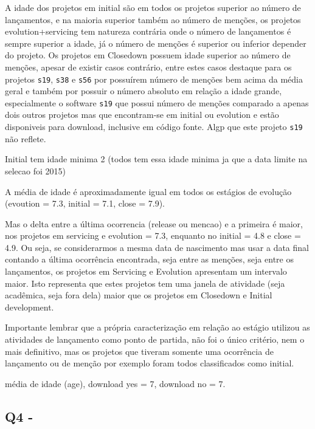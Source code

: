 A idade dos projetos em initial são em todos os projetos superior ao número de
lançamentos, e na maioria superior também ao número de menções, os projetos
evolution+servicing tem natureza contrária onde o número de lançamentos é
sempre superior a idade, já o número de menções é superior ou inferior depender
do projeto. Os projetos em Closedown possuem idade superior ao número de
menções, apesar de existir casos contrário, entre estes casos destaque para os
projetos \texttt{s19}, \texttt{s38} e \texttt{s56} por possuírem número de
menções bem acima da média geral e também por possuir o número absoluto em
relação a idade grande, especialmente o software \texttt{s19} que possui número
de menções comparado a apenas dois outros projetos mas que encontram-se em
initial ou evolution e estão disponiveis para download, inclusive em código
fonte. Algp que este projeto \texttt{s19} não reflete.

Initial tem idade minima 2 (todos tem essa idade minima ja que a data limite na selecao foi 2015)

A média de idade é aproximadamente igual em todos os estágios de evolução (evoution = 7.3, initial = 7.1, close = 7.9).

Mas o delta entre a última ocorrencia (release ou mencao) e a primeira é maior,
nos projetos em servicing e evolution = 7.3,
enquanto no initial = 4.8 e close = 4.9. Ou seja, se considerarmos a mesma data de nascimento
mas usar a data final contando a última ocorrência encontrada, seja entre as menções, seja
entre os lançamentos, os projetos em Servicing e Evolution apresentam um intervalo maior. Isto
representa que estes projetos tem uma janela de atividade (seja acadêmica, seja fora dela) maior que
os projetos em Closedown e Initial development.

Importante lembrar que a própria caracterização em relação ao estágio utilizou
as atividades de lançamento como ponto de partida, não foi o único critério, nem o mais
definitivo, mas os projetos que tiveram somente uma ocorrência de lançamento ou de menção por exemplo
foram todos classificados como initial.

média de idade (age),
  download yes = 7,
  download no = 7.

\subsection{Q4 - \QuestaoQuatro} %

%

